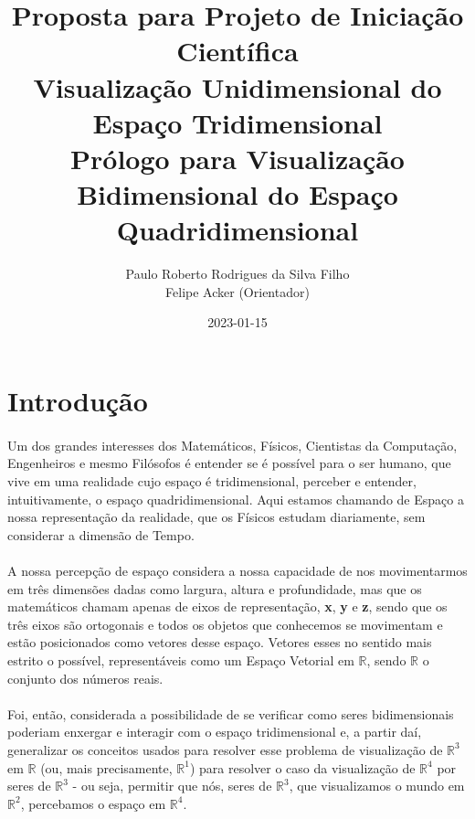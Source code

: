 \documentclass{article}
\title{
	Proposta para Projeto de Iniciação Científica \\
	Visualização Unidimensional do Espaço Tridimensional \\
	\large Prólogo para Visualização Bidimensional do Espaço Quadridimensional
}
\date{2023-01-15}
\author{Paulo Roberto Rodrigues da Silva Filho\\ \small Felipe Acker (Orientador)}
\newcommand\R{\mathbb{R}}
\begin{document}
	\renewcommand{\figurename}{Figura}
	\graphicspath{ {./imagens/} }
	\maketitle
	\tableofcontents
	
	\section{Introdução}
	
	\paragraph{} Um dos grandes interesses dos Matemáticos, Físicos, Cientistas da Computação, Engenheiros e mesmo Filósofos é entender se é possível para o ser humano, que vive em uma realidade cujo espaço é tridimensional, perceber e entender, intuitivamente, o espaço quadridimensional. Aqui estamos chamando de Espaço a nossa representação da realidade, que os Físicos estudam diariamente, sem considerar a dimensão de Tempo. 
	
	\paragraph{}
	A nossa percepção de espaço considera a nossa capacidade de nos movimentarmos em três dimensões dadas como largura, altura e profundidade, mas que os matemáticos chamam apenas de eixos de representação, \textbf{x}, \textbf{y} e \textbf{z}, sendo que os três eixos são ortogonais e todos os objetos que conhecemos se movimentam e estão posicionados como vetores desse espaço. Vetores esses no sentido mais estrito o possível, representáveis como um Espaço Vetorial em $\R$, sendo $\R$ o conjunto dos números reais.
	
	\paragraph{}
	Foi, então, considerada a possibilidade de se verificar como seres bidimensionais poderiam enxergar e interagir com o espaço tridimensional e, a partir daí, generalizar os conceitos usados para resolver esse problema de visualização de $\R^3$ em $\R$ (ou, mais precisamente, $\R^1$) para resolver o caso da visualização de $\R^4$ por seres de $\R^3$ - ou seja, permitir que nós, seres de $\R^3$, que visualizamos o mundo em $\R^2$, percebamos o espaço em $\R^4$.
	
\end{document}
